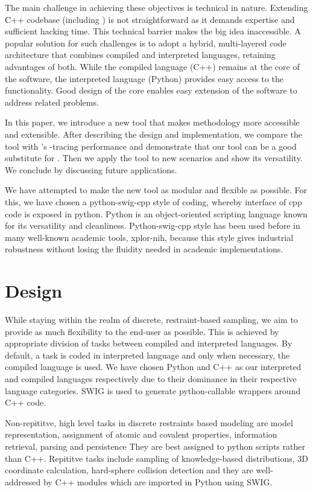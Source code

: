 \documentclass{article}[14pts]
\begin{document}
The main challenge in achieving these objectives is technical in nature. Extending C++ codebase (including \rapper) is not straightforward as it demands expertise and sufficient hacking time. This technical barrier makes the big idea inaccessible. A popular solution for such challenges is to adopt a hybrid, multi-layered code architecture that combines compiled and interpreted languages, retaining advantages of both. While the compiled language (\eg C++) remains at the core of the software, the interpreted language (\eg Python) provides easy access to the functionality. Good design of the core enables easy extension of the software to address related problems.

In this paper, we introduce a new tool that makes \rapper methodology more accessible and extensible. After describing the design and implementation, we compare the tool with \rapper's \CA-tracing performance and demonstrate that our tool can be a good substitute for \rapper. Then we apply the tool to new scenarios and show its versatility. We conclude by discussing future applications.

We have attempted to make the new tool as modular and flexible as possible. For this, we have chosen a python-swig-cpp style of coding, whereby interface of cpp code is exposed in python. Python is an object-oriented scripting language known for its versatility and cleanliness. Python-swig-cpp style has been used before in many well-known academic tools, \eg xplor-nih, because this style gives industrial robustness without losing the fluidity needed in academic implementations.

\section{Design}
While staying within the realm of discrete, restraint-based sampling, we aim to provide as much flexibility to the end-user as possible. This is achieved by appropriate division of tasks between compiled and interpreted languages. By default, a task is coded in interpreted language and only when necessary, the compiled language is used. We have chosen Python and C++ as our interpreted and compiled languages respectively due to their dominance in their respective language categories. SWIG is used to generate python-callable wrappers around C++ code.

Non-repititve, high level tasks in discrete restraints based modeling are model representation, assignment of atomic and covalent properties, information retrieval, parsing and persistence \etc They are best assigned to python scripts rather than C++. Repititve tasks include sampling of knowledge-based distributions, 3D coordinate calculation, hard-sphere collision detection \etc and they are well-addressed by C++ modules which are imported in Python using SWIG.
\end{document}
